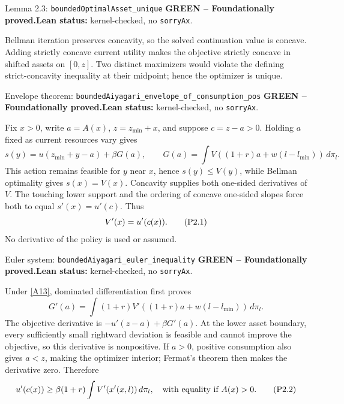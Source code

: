\documentclass[11pt]{article}
\newcommand{\leanname}[1]{\nolinkurl{#1}}
\newcommand{\eqP}[1]{\refstepcounter{equation}\tag{P#1}}
\newcommand{\formalcheck}{\textbf{Lean status:} kernel-checked, no \texttt{sorryAx}.}
\newcommand{\greenstatus}{\textcolor{proved}{\textbf{GREEN -- Foundationally proved.}}}
\begin{document}
\begin{greenbox}{Lemma 2.3: \leanname{boundedOptimalAsset_unique}}
\greenstatus\quad\formalcheck

Bellman iteration preserves concavity, so the solved continuation value is
concave.  Adding strictly concave current utility makes the objective strictly
concave in shifted assets on \([0,z]\).  Two distinct maximizers would violate
the defining strict-concavity inequality at their midpoint; hence the
optimizer is unique.
\end{greenbox}

\begin{greenbox}{Envelope theorem: \leanname{boundedAiyagari_envelope_of_consumption_pos}}
\greenstatus\quad\formalcheck

Fix $x>0$, write $a=A(x)$, $z=z_{\min}+x$, and suppose
$c=z-a>0$.  Holding $a$ fixed as current resources vary gives
\[
 s(y)=u(z_{\min}+y-a)+\beta G(a),\qquad
 G(a)=\int V((1+r)a+w(l-l_{\min}))\,d\pi_l.
\]
This action remains feasible for $y$ near $x$, hence $s(y)\le V(y)$,
while Bellman optimality gives $s(x)=V(x)$.  Concavity supplies both
one-sided derivatives of $V$.  The touching lower support and the ordering
of concave one-sided slopes force both to equal $s'(x)=u'(c)$.  Thus
\begin{equation}
 V'(x)=u'(c(x)). \eqP{2.1}\label{P2.1}
\end{equation}
No derivative of the policy is used or assumed.
\end{greenbox}

\begin{greenbox}{Euler system: \leanname{boundedAiyagari_euler_inequality}}
\greenstatus\quad\formalcheck

Under \eqref{A13}, dominated differentiation first proves
\[
 G'(a)=\int (1+r)V'((1+r)a+w(l-l_{\min}))\,d\pi_l.
\]
The objective derivative is $-u'(z-a)+\beta G'(a)$.  At the lower
asset boundary, every sufficiently small rightward deviation is feasible and
cannot improve the objective, so this derivative is nonpositive.  If $a>0$,
positive consumption also gives $a<z$, making the optimizer interior;
Fermat's theorem then makes the derivative zero.  Therefore
\begin{equation}
 u'(c(x))\ge \beta(1+r)\int V'(x'(x,l))\,d\pi_l,
 \quad\text{with equality if }A(x)>0. \eqP{2.2}\label{P2.2}
\end{equation}
\end{greenbox}
\end{document}
